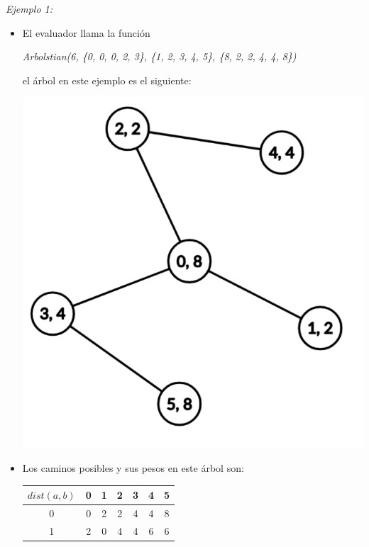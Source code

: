 \documentclass[12pt]{scrartcl}
\begin{document}
        {\itshape Ejemplo 1:}
        \begin{itemize}
            \item El evaluador llama la función 
            \begin{center}
                \textit{Arbolstian(6, \{0, 0, 0, 2, 3\}, \{1, 2, 3, 4, 5\}, \{8, 2, 2, 4, 4, 8\})}
            \end{center}
            el árbol en este ejemplo es el siguiente:
            
            \begin{center}
                \includegraphics[scale=0.25]{ej1.png}
            \end{center}
            \item Los caminos posibles y sus pesos en este árbol son:
            \begin{center}
                \begin{tabular}{|c||c|c|c|c|c|c|}
                    \hline
                     $dist(a, b)$ & 0 & 1 & 2 & 3 & 4 & 5 \\
                     \hline
                     \hline
                     0 & 0 & 2 & 2 & 4 & 4 & 8 \\
                     \hline
                     1 & 2 & 0 & 4 & 4 & 6 & 6 \\

\end{tabular}
\end{center}
\end{itemize}
\end{document}
